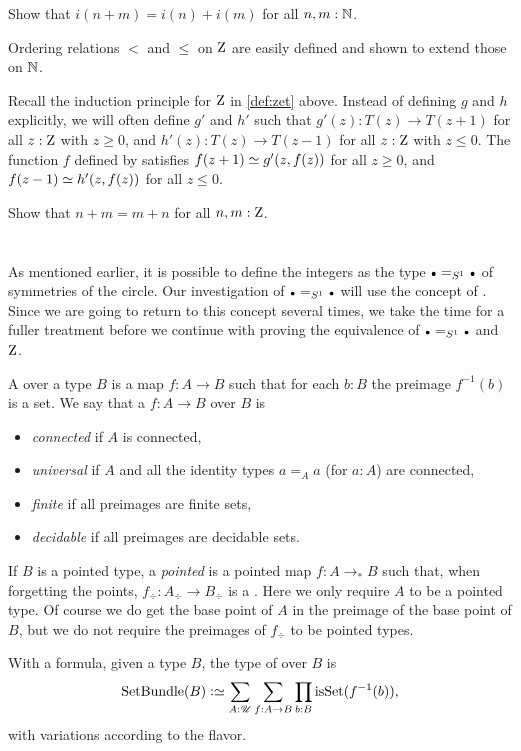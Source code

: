 \begin{xca}\label{xca:addition-on-Z-and-N}
Show that $i(n+m)=i(n)+i(m)$ for all $n,m:\mathbb{N}$.
\end{xca}

Ordering relations $<$ and $\leq$ on $\mathrm{Z}$ are easily defined
and shown to extend those on $\mathbb{N}$.

Recall the induction principle for $\mathrm{Z}$ in \cref{def:zet} above.
Instead of defining $g$ and $h$ explicitly, we will often
define $g'$ and $h'$ such that $g'(z): T(z)\to T(z+1)$ 
for all $z:\mathrm{Z}$ with $z\geq 0$, and $h'(z): T(z)\to T(z-1)$ 
for all $z:\mathrm{Z}$ with $z\leq 0$. The function $f$ defined by 
satisfies $f(z+1)\jdeq g'(z,f(z))$ for all $z\geq 0$,
and $f(z-1)\jdeq h'(z,f(z))$ for all $z\leq 0$.

\begin{xca}\label{xca:commutative-add-Z}
Show that $n+m = m+n$ for all $n,m:\mathrm{Z}$.  
\end{xca}


\section{\Coverings}
\label{sec:covering}

As mentioned earlier, it is possible to define the integers as the
type $\base=_{S^1}\base$ of symmetries of the circle.
Our investigation of $\base=_{S^1}\base$ will use the concept of \coverings. 
Since we are going to return to this concept several times, 
we take the time for a fuller treatment before we continue with
proving the equivalence of $\base=_{S^1}\base$ and $\mathrm{Z}$.

\begin{definition}\label{def:covering}
A \emph{\covering} over a type $B$ 
is a map $f:A\to B$ such that for each $b:B$ the preimage $f^{-1}(b)$ is a set.
We say that a \covering $f:A\to B$ over $B$ is
\begin{itemize}
\item \emph{connected} if $A$ is connected, 
\item \emph{universal} if $A$ and all 
the identity types $a=_Aa$ (for $a:A$) are connected, 
\item \emph{finite} if all preimages are finite sets,
\item \emph{decidable} if all preimages are decidable sets.
\end{itemize}
If $B$ is a pointed type, a \emph{pointed} \covering is a pointed map $f:A\to_*B$ such that, when forgetting the points, $f_\div:A_\div\to B_\div$ is a \covering. Here we only
require $A$ to be a pointed type. Of course we do get the base point of $A$ in the 
preimage of the base point of $B$, but we do not require the preimages of $f_\div$
to be pointed types.
\end{definition}
With a formula, given a type $B$, the type of \coverings over $B$ is
\[
\SetBundle(B) \defeq \sum_{A:\UU}\sum_{f:A\to B}\prod_{b:B}\isset(f^{-1}(b)),
\]
with variations according to the flavor.

